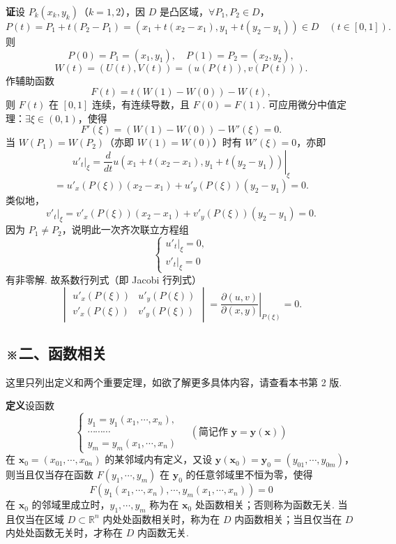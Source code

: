 \documentclass[UTF8,12pt,a4paper,fontset=fandol]{ctexart}
\begin{document}
\noindent\textbf{证}\quad 设 $P_k(x_k,y_k)$（$k=1,2$），因 $D$ 是凸区域，$\forall P_1,P_2\in D$，
\[
  P(t)=P_1+t(P_2-P_1)=(x_1+t(x_2-x_1),y_1+t(y_2-y_1))\in D
  \quad(t\in[0,1]).
\]
则
\[
  P(0)=P_1=(x_1,y_1),\quad P(1)=P_2=(x_2,y_2),
\]
\[
  W(t)=(U(t),V(t))=(u(P(t)),v(P(t))).
\]
作辅助函数
\[
  F(t)=t(W(1)-W(0))-W(t),
\]
则 $F(t)$ 在 $[0,1]$ 连续，有连续导数，且 $F(0)=F(1)$. 可应用微分中值定理：$\exists\xi\in(0,1)$，使得
\[
  F'(\xi)=(W(1)-W(0))-W'(\xi)=0.
\]
当 $W(P_1)=W(P_2)$（亦即 $W(1)=W(0)$）时有 $W'(\xi)=0$，亦即
\[
  \left.u'_t\right|_\xi
  =
  \left.\frac d{dt}u(x_1+t(x_2-x_1),y_1+t(y_2-y_1))\right|_\xi
\]
\[
  =u'_x(P(\xi))(x_2-x_1)+u'_y(P(\xi))(y_2-y_1)=0.
\]
类似地，
\[
  \left.v'_t\right|_\xi
  =v'_x(P(\xi))(x_2-x_1)+v'_y(P(\xi))(y_2-y_1)=0.
\]
因为 $P_1\ne P_2$，说明此一次齐次联立方程组
\[
\begin{cases}
  \left.u'_t\right|_\xi=0,\\
  \left.v'_t\right|_\xi=0
\end{cases}
\]
有非零解. 故系数行列式（即 Jacobi 行列式）
\[
  \begin{vmatrix}
    u'_x(P(\xi)) & u'_y(P(\xi))\\
    v'_x(P(\xi)) & v'_y(P(\xi))
  \end{vmatrix}
  =
  \left.\frac{\partial(u,v)}{\partial(x,y)}\right|_{P(\xi)}
  =0.
\]

\subsection*{※二、函数相关}

这里只列出定义和两个重要定理，如欲了解更多具体内容，请查看本书第 2 版.

\noindent\textbf{定义}\quad 设函数
\[
\begin{cases}
  y_1=y_1(x_1,\cdots,x_n),\\
  \cdots\cdots\cdots\\
  y_m=y_m(x_1,\cdots,x_n)
\end{cases}
\quad(\text{简记作 } \mathbf y=\mathbf y(\mathbf x))
\]
在 $\mathbf x_0=(x_{01},\cdots,x_{0n})$ 的某邻域内有定义，又设
$\mathbf y(\mathbf x_0)=\mathbf y_0=(y_{01},\cdots,y_{0m})$，则当且仅当存在函数
$F(y_1,\cdots,y_m)$ 在 $\mathbf y_0$ 的任意邻域里不恒为零，使得
\[
  F(y_1(x_1,\cdots,x_n),\cdots,y_m(x_1,\cdots,x_n))=0
\]
在 $\mathbf x_0$ 的邻域里成立时，$y_1,\cdots,y_m$ 称为在 $\mathbf x_0$ 处函数相关；否则称为函数无关. 当且仅当在区域 $D\subset\mathbb R^n$ 内处处函数相关时，称为在 $D$ 内函数相关；当且仅当在 $D$ 内处处函数无关时，才称在 $D$ 内函数无关.
\end{document}
